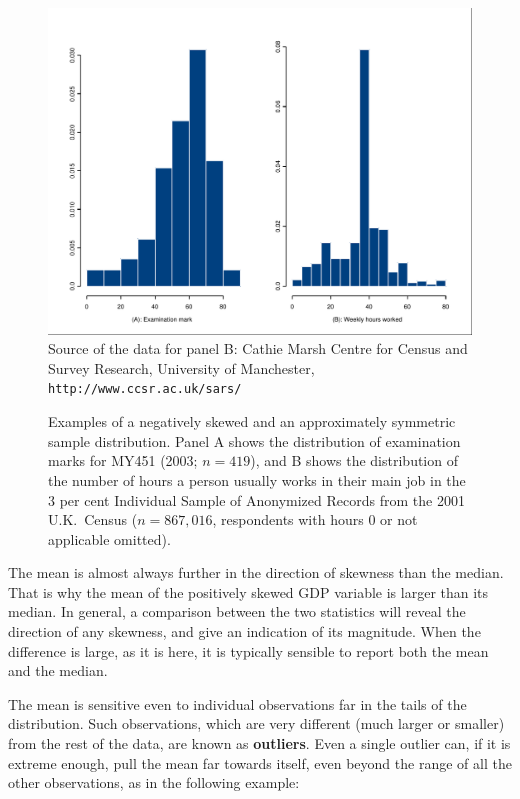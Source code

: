 \begin{figure}[p]
\caption{Examples of a negatively skewed and an approximately symmetric
sample distribution. Panel A shows the distribution of examination
marks for MY451 (2003; $n=419$), and
B shows the distribution of the number of
hours a person usually works in
their main job in the 3 per cent Individual
Sample of Anonymized Records from the 2001 U.K.\ Census
($n=867,016$, respondents with hours 0 or not applicable omitted).}
\label{f_skews}
\begin{center}
\includegraphics[width=14cm]{twohists}
\\
{\footnotesize
Source
of the data for panel B:
Cathie Marsh Centre for Census and Survey Research,
University of Manchester, \texttt{http://www.ccsr.ac.uk/sars/}
}
\end{center}
\end{figure}

The mean is almost always further in the direction of skewness than the
median. That is why the mean of the positively skewed GDP variable is
larger than its median. In general, a comparison between the two
statistics will reveal the direction of any skewness, and give an
indication of its magnitude. When the difference is large, as it is
here, it is typically sensible to report both the mean and the median.

The mean is sensitive even to individual observations far in the tails
of the distribution. Such observations, which are very different (much
larger or smaller) from the rest of the data, are known as
\textbf{outliers}. Even a single outlier can, if it is extreme enough,
pull the mean far towards itself, even beyond the range of all the
other observations, as in the following example:

